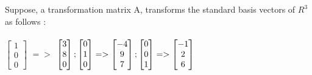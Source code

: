 \documentclass[solution,addpoints,12pt]{exam}
\newenvironment{Solution}{\begin{EnvFullwidth}\begin{solution}}{\end{solution}\end{EnvFullwidth}}
\begin{document}
\begin{questions}

\question Suppose, a transformation matrix A, transforms the standard basis vectors of $R^3$ as follows : \\
\\
$\begin{bmatrix}
    1  \\
    0 \\
    0
 \end{bmatrix}$
 $=>$
$\begin{bmatrix}
    3  \\
    8 \\
    0
 \end{bmatrix}
 ;
 \begin{bmatrix}
    0  \\
    1 \\
    0
 \end{bmatrix}
 =>
\begin{bmatrix}
    -4  \\
    9 \\
    7
 \end{bmatrix}
;
\begin{bmatrix}
    0  \\
    0 \\
    1
 \end{bmatrix}
 =>
\begin{bmatrix}
    -1  \\
    2 \\
    6
 \end{bmatrix}
\\$
\end{questions}
\end{document}
